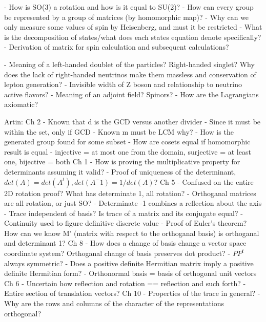 \documentclass[11 pt, twoside]{article}
\begin{document}
- How is SO(3) a rotation and how is it equal to SU(2)?
- How can every group be represented by a group of matrices (by homomorphic map)?
- Why can we only measure some values of spin by Heisenberg, and must it be restricted
- What is the decomposition of states/what does each states equation denote specifically?
- Derivation of matrix for spin calculation and subsequent calculations?

- Meaning of a left-handed doublet of the particles? Right-handed singlet? Why does the lack of right-handed neutrinos make them massless and conservation of lepton generation?
- Invisible width of Z boson and relationship to neutrino active flavors?
- Meaning of an adjoint field? Spinors?
- How are the Lagrangians axiomatic?

Artin:
Ch 2 - Known that d is the GCD versus another divider - Since it must be within the set, only if GCD
	 - Known m must be LCM why?
	 - How is the generated group found for some subset
	 - How are cosets equal if homomorphic result is equal
	 - injective = at most one from the domain, surjective = at least one, bijective = both
Ch 1 - How is proving the multiplicative property for determinants assuming it valid?
	 - Proof of uniqueness of the determinant, $det(A) = det(A^t), det(A^-1) = 1/det(A)$?
Ch 5 - Confused on the entire 2D rotation proof? What has determinate 1, all rotation?
	 - Orthoganal matrices are all rotation, or just SO? 
	 - Determinate -1 combines a reflection about the axis
	 - Trace independent of basis? Is trace of a matrix and its conjugate equal?
	 - Continuity used to figure definitive discrete value
	 - Proof of Euler's theorem? How can we know M' (matrix with respect to the orthoganal basis) is orthoganal and determinant 1?
Ch 8 - How does a change of basis change a vector space coordinate system? Orthoganal change of basis preserves dot product?
	 - $PP^t$ always symmetric?
	 - Does a positive definite Hermitian matrix imply a positive definite Hermitian form?
	 - Orthonormal basis = basis of orthogonal unit vectors
Ch 6 - Uncertain how reflection and rotation == reflection and such forth?
	 - Entire section of translation vectors?
Ch 10 - Properties of the trace in general?
	  - Why are the rows and columns of the character of the representations orthogonal?
\end{document}
